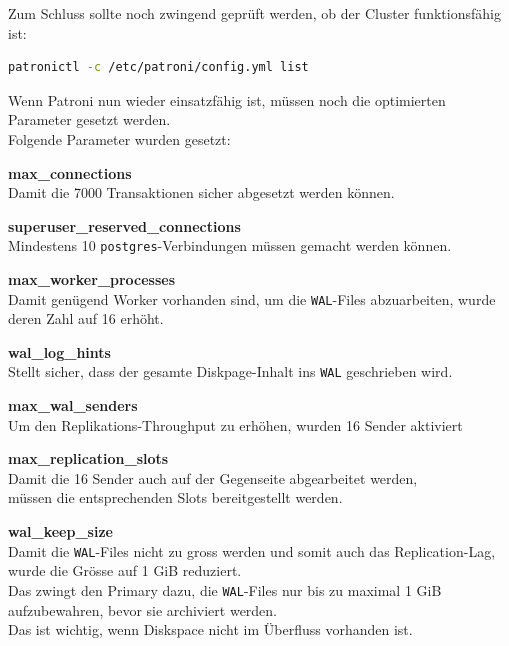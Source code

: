 Zum Schluss sollte noch zwingend geprüft werden, ob der Cluster funktionsfähig ist:
\lstset{style=gra_codestyle}
\begin{lstlisting}[language=bash, caption=Patroni - 250GiB Finaler Check,captionpos=b,label={lst:patroni_250gib_final_check},breaklines=true]
patronictl -c /etc/patroni/config.yml list
\end{lstlisting}

Wenn Patroni nun wieder einsatzfähig ist, müssen noch die optimierten Parameter gesetzt werden.\\
Folgende Parameter wurden gesetzt:\\
\begin{description}
    \item \textbf{max\_connections}\hfill \\Damit die 7000 Transaktionen sicher abgesetzt werden können.
    \item \textbf{superuser\_reserved\_connections}\hfill \\Mindestens 10 \texttt{postgres}-Verbindungen müssen gemacht werden können.
    \item \textbf{max\_worker\_processes}\hfill \\Damit genügend Worker vorhanden sind, um die \texttt{WAL}-Files abzuarbeiten, wurde deren Zahl auf 16 erhöht.
    \item \textbf{wal\_log\_hints}\hfill \\Stellt sicher, dass der gesamte Diskpage-Inhalt ins \texttt{WAL} geschrieben wird.
    \item \textbf{max\_wal\_senders}\hfill \\Um den Replikations-Throughput zu erhöhen, wurden 16 Sender aktiviert
    \item \textbf{max\_replication\_slots}\hfill \\Damit die 16 Sender auch auf der Gegenseite abgearbeitet werden,\\müssen die entsprechenden Slots bereitgestellt werden.
    \item \textbf{wal\_keep\_size}\hfill \\Damit die \texttt{WAL}-Files nicht zu gross werden und somit auch das Replication-Lag,\\wurde die Grösse auf 1 GiB reduziert.\\Das zwingt den Primary dazu, die \texttt{WAL}-Files nur bis zu maximal 1 GiB aufzubewahren, bevor sie archiviert werden.\\Das ist wichtig, wenn Diskspace nicht im Überfluss vorhanden ist.

\end{description}
